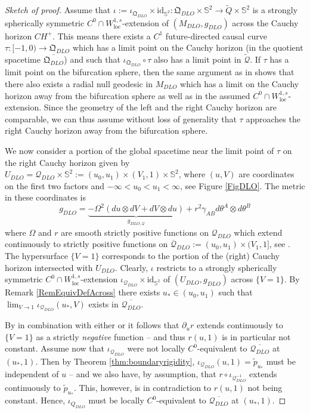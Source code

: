 \documentclass{article}
\newcommand{\Q}{\mathcal{Q}}
\newcommand{\loc}{\mathrm{loc}}
\newcommand{\Sp}{\mathbb{S}}
\newcommand{\id}{\mathrm{id}}
\newcommand{\rd}{\partial}
\begin{document}
\begin{proof}[Sketch of proof]
    Assume that $\iota := \iota_{\mathfrak{Q}_{DLO}} \times \id_{\Sp^2} : \mathfrak{Q}_{DLO} \times \Sp^2 \to \tilde{Q} \times \Sp^2$ is a strongly spherically symmetric $C^0\cap W^{1,s}_{\loc}$-extension of $(M_{DLO},g_{DLO})$ across the Cauchy horizon $CH^+$. This means there exists a $C^1$ future-directed causal curve $\tau : [-1,0) \to \mathfrak{Q}_{DLO}$ which has a limit point on the Cauchy horizon (in the quotient spacetime $\overline{\mathfrak{Q}_{DLO}}$) and such that $\iota_{\mathfrak{Q}_{DLO}} \circ \tau$ also has a limit point in $\tilde{\Q}$. If $\tau$ has a limit point on the bifurcation sphere, then the same argument as in \cite[Step 2.2 of proof of Theorem 4.1]{Sbie22a} shows that there also exists a radial null geodesic in $M_{DLO}$ which has a limit on the Cauchy horizon away from the bifurcation sphere as well as in the assumed $C^0 \cap W^{1,s}_{\loc}$-extension. Since the geometry of the left and the right Cauchy horizon are comparable, we can thus assume without loss of generality that $\tau$ approaches the right Cauchy horizon away from the bifurcation sphere.

We now consider a portion of the global spacetime near the limit point of $\tau$ on the right Cauchy horizon given by $U_{DLO}=\Q_{DLO}\times \Sp^2:=(u_0,u_1)\times(V_1,1)\times \Sp^2$, where $(u,V)$ are coordinates on the first two factors and $-\infty < u_0 < u_1 < \infty$, see Figure \ref{FigDLO}. The metric in these coordinates is
\begin{equation}
    g_{DLO}=\underbrace{-\Omega^2\left(du\otimes dV+dV\otimes du\right)}_{g_{DLO,\Q}}+r^2\gamma_{AB}d\theta^A\otimes d\theta^B
\end{equation}
where $\Omega$ and $r$ are smooth strictly positive functions on $\Q_{DLO}$ which extend continuously to strictly positive functions on $\overline{\Q}_{DLO}:=(u_0,u_1)\times(V_1,1]$, see \cite[Theorem 5.5]{LukOh19I}. The hypersurface $\{V=1\}$ corresponds to the portion of the (right) Cauchy horizon intersected with $U_{DLO}$. Clearly, $\iota$ restricts to a strongly spherically symmetric $C^0\cap W^{1,s}_{\loc}$-extension $\iota_{\Q_{DLO}} \times \id_{\Sp^2}$ of $(U_{DLO},g_{DLO})$ across  $\{V=1\}$. By Remark \ref{RemEquivDefAcross} there exists $u_* \in (u_0,u_1)$ such that $\lim_{V \to 1}\iota_{\Q_{DLO}}(u_*,V)$ exists in $\overline{\Q_{DLO}}$.

By \cite{Gautam} in combination with either \cite{Daf05a} or \cite{LukOhShla23} it follows that $\rd_u r$ extends continuously to $\{V=1\}$ as a strictly  \emph{negative} function -- and thus $r(u,1)$ is in particular not constant. Assume now that $\iota_{\Q_{DLO}}$ were not locally $C^0$-equivalent to $\overline{\Q_{DLO}}$ at $(u_*,1)$. Then by Theorem \ref{thm:boundaryrigidity}, $\iota_{\Q_{DLO}}(u,1) = \tilde{p}_{u_*}$ must be independent of $u$ -- and we also have, by assumption, that $r \circ \iota_{\Q_{DLO}^{-1}}$ extends continuously to $\tilde{p}_{u_*}$. This, however, is in contradiction to $r(u,1)$
 not being constant. Hence, $\iota_{Q_{DLO}}$ must be locally $C^0$-equivalent to $\overline{\Q_{DLO}}$ at $(u_*,1)$.


\end{proof}
\end{document}
